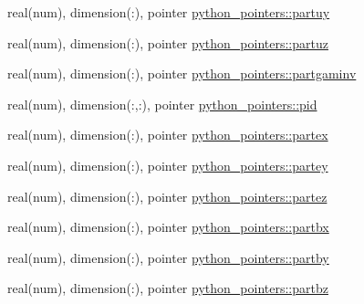 \begin{DoxyCompactItemize}
$$\item 
real(num), dimension(\+:), pointer \hyperlink{namespacepython__pointers_a60b173a25b047377d55cd66dfb5fad04}{python\+\_\+pointers\+::partuy}
\item 
real(num), dimension(\+:), pointer \hyperlink{namespacepython__pointers_a98c8cf1649933f3239b068104d637d6c}{python\+\_\+pointers\+::partuz}
\item 
real(num), dimension(\+:), pointer \hyperlink{namespacepython__pointers_a072266fc5f086ac68bdb72332b296a07}{python\+\_\+pointers\+::partgaminv}
\item 
real(num), dimension(\+:,\+:), pointer \hyperlink{namespacepython__pointers_a8a754456a1a3440c897f9a6249782713}{python\+\_\+pointers\+::pid}
\item 
real(num), dimension(\+:), pointer \hyperlink{namespacepython__pointers_ad4fc57017cff184e92ae60ff0006c62c}{python\+\_\+pointers\+::partex}
\item 
real(num), dimension(\+:), pointer \hyperlink{namespacepython__pointers_af358e4be4f10aeff30df94181589c382}{python\+\_\+pointers\+::partey}
\item 
real(num), dimension(\+:), pointer \hyperlink{namespacepython__pointers_a61f858897e873f37d7bb3e355e2b9740}{python\+\_\+pointers\+::partez}
\item 
real(num), dimension(\+:), pointer \hyperlink{namespacepython__pointers_a9de58f9a1f88381cac4457014ee8859f}{python\+\_\+pointers\+::partbx}
\item 
real(num), dimension(\+:), pointer \hyperlink{namespacepython__pointers_aab1fc483934951de61c30198fa476e40}{python\+\_\+pointers\+::partby}
\item 
real(num), dimension(\+:), pointer \hyperlink{namespacepython__pointers_a9c50a4b64ff01114243eebc0dc729ae8}{python\+\_\+pointers\+::partbz}
\end{DoxyCompactItemize}
